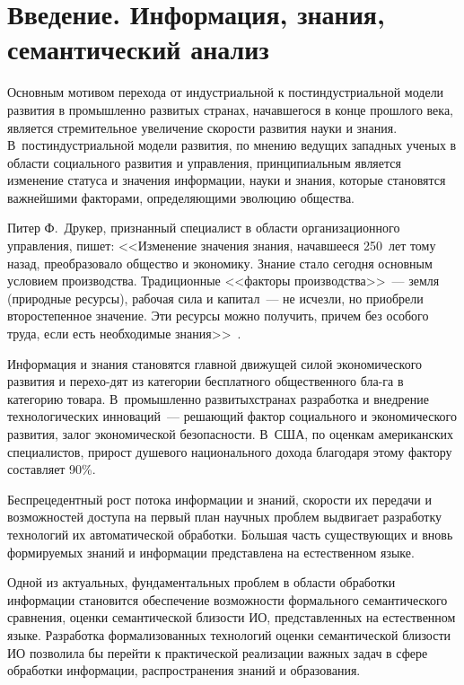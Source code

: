       \begin{multicols}{2}
      
            \label{st\stat}

\section{Введение. Информация, знания, семантический анализ}
   
   Основным мотивом перехода от индустриальной к постиндустриальной 
модели развития в промышленно развитых странах, начавшегося в конце 
прошлого века, является стремительное увеличение скорости развития науки 
и знания. В~постиндустриальной модели развития, по мнению ведущих 
западных ученых в области социального развития и управления, 
принципиальным является изменение статуса и значения информации, науки 
и знания, которые становятся важнейшими факторами, определяющими 
эволюцию общества. 
   
   Питер Ф.~Друкер, признанный специалист в области организационного 
управления, пишет: <<Изменение значения знания, начавшееся 250~лет тому 
назад, преобразовало общество и экономику. Знание стало сегодня основным 
условием производства. Традиционные <<факторы производства>>~--- земля 
(природные ресурсы), рабочая сила и капитал~--- не исчезли, но приобрели 
второстепенное значение. Эти ресурсы можно получить, причем без особого 
труда, если есть необходимые знания>>~\cite{1-k}. 
   
   Информация и знания становятся главной движущей силой 
экономического развития и перехо-\linebreak дят из категории бесплатного 
общественного бла-\linebreak га в категорию товара. В~промышленно развитых\linebreak \mbox{странах} 
разработка и внедрение технологических инноваций~--- решающий фактор 
социального и экономического развития, залог экономической безопасности. 
В~США, по оценкам американских специалистов, прирост душевого 
национального дохода благодаря этому фактору составляет 90\%. 
   
   Беспрецедентный рост потока информации и знаний, скорости их 
передачи и возможностей доступа на первый план научных проблем 
выдвигает разработку технологий их автоматической обработки. Б$\acute{\mbox{о}}$льшая 
часть существующих и вновь формируемых знаний и информации 
представлена на естественном языке. 

Одной из актуальных, 
фундаментальных проблем в области обработки информации становится 
обеспечение возможности формального семантического сравнения, оценки 
семантической \mbox{бли\-зости} ИО, представленных 
на естественном языке. Разработка формализованных технологий оценки 
семантической близости ИО позволила бы перейти к практической 
реализации важных задач в сфере обработки информации, распространения 
знаний и образования. 
   

\end{multicols}
